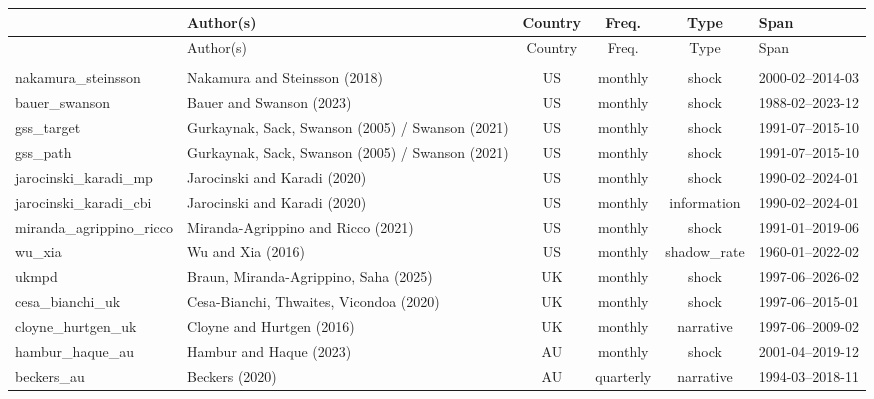{\small
\setlength{\tabcolsep}{4pt}
\renewcommand{\arraystretch}{1.15}
\begin{longtable}{@{}>{\ttfamily\scriptsize}p{3.8cm} p{4.6cm} c c c l@{}}
\toprule
\multicolumn{1}{l}{\normalsize\textnormal{Series}} & Author(s) & Country & Freq. & Type & Span \\
\midrule
\endfirsthead
\toprule
\multicolumn{1}{l}{\normalsize\textnormal{Series}} & Author(s) & Country & Freq. & Type & Span \\
\midrule
\endhead
\midrule
\multicolumn{6}{r}{\textit{(continued on next page)}} \\
\endfoot
\bottomrule
\endlastfoot
nakamura\_steinsson & Nakamura and Steinsson (2018) & US & monthly & shock & 2000-02--2014-03 \\
bauer\_swanson & Bauer and Swanson (2023) & US & monthly & shock & 1988-02--2023-12 \\
gss\_target & Gurkaynak, Sack, Swanson (2005) / Swanson (2021) & US & monthly & shock & 1991-07--2015-10 \\
gss\_path & Gurkaynak, Sack, Swanson (2005) / Swanson (2021) & US & monthly & shock & 1991-07--2015-10 \\
jarocinski\_karadi\_mp & Jarocinski and Karadi (2020) & US & monthly & shock & 1990-02--2024-01 \\
jarocinski\_karadi\_cbi & Jarocinski and Karadi (2020) & US & monthly & information & 1990-02--2024-01 \\
miranda\_agrippino\_ricco & Miranda-Agrippino and Ricco (2021) & US & monthly & shock & 1991-01--2019-06 \\
wu\_xia & Wu and Xia (2016) & US & monthly & shadow\_rate & 1960-01--2022-02 \\
ukmpd & Braun, Miranda-Agrippino, Saha (2025) & UK & monthly & shock & 1997-06--2026-02 \\
cesa\_bianchi\_uk & Cesa-Bianchi, Thwaites, Vicondoa (2020) & UK & monthly & shock & 1997-06--2015-01 \\
cloyne\_hurtgen\_uk & Cloyne and Hurtgen (2016) & UK & monthly & narrative & 1997-06--2009-02 \\
hambur\_haque\_au & Hambur and Haque (2023) & AU & monthly & shock & 2001-04--2019-12 \\
beckers\_au & Beckers (2020) & AU & quarterly & narrative & 1994-03--2018-11 \\
\end{longtable}
}
